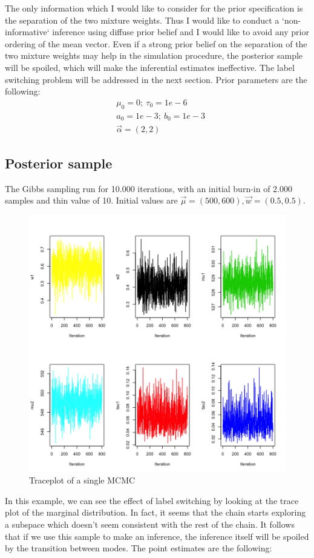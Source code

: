 \documentclass{article}
\begin{document}
The only information which I would like to consider for the prior specification is the separation of the two mixture weights. Thus I would like to conduct a `non-informative` inference using diffuse prior belief and I would like to avoid any prior ordering of the mean vector. Even if a strong prior belief on the separation of the two mixture weights may help in the simulation procedure, the posterior sample will be spoiled, which will make the inferential estimates ineffective. The label switching problem will be addressed in the next section. 
Prior parameters are the following:
\begin{align*}
& \mu_0 = 0; \ \tau_0 = 1e-6 \\
& a_0 = 1e-3;\  b_0 = 1e-3 \\
& \vec \alpha = (2,2)
\end{align*}

\subsection{Posterior sample}
The Gibbs sampling run for 10.000 iterations, with an initial burn-in of 2.000 samples and thin value of 10. Initial values are $\vec \mu = (500, 600), \vec w = (0.5,0.5)$. 

\begin{figure}[h!]
    \centering
    \includegraphics[width=.7\textwidth]{plot_3.png}
    \caption{Traceplot of a single MCMC}
    \label{Monkey measurement}
\end{figure}

In this example, we can see the effect of label switching by looking at the trace plot of the marginal distribution. In fact, it seems that the chain starts exploring a subspace which doesn't seem consistent with the rest of the chain. It follows that if we use this sample to make an inference, the inference itself will be spoiled by the transition between modes. The point estimates are the following:
\end{document}
